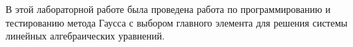 
    В этой лабораторной работе была проведена работа по программированию и тестированию метода Гаусса с выбором главного элемента для решения системы линейных алгебраических уравнений.
